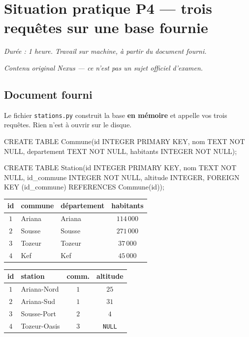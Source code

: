 \section*{Situation pratique P4 --- trois requêtes sur une base fournie}

\textit{Durée : 1 heure. Travail sur machine, à partir du document fourni.}

\medskip
\textit{Contenu original Nexus --- ce n'est pas un sujet officiel d'examen.}

\subsection*{Document fourni}

Le fichier \lstinline{stations.py} construit la base \textbf{en mémoire} et
appelle vos trois requêtes. Rien n'est à ouvrir sur le disque.

\begin{sql}
CREATE TABLE Commune(id INTEGER PRIMARY KEY, nom TEXT NOT NULL,
                     departement TEXT NOT NULL, habitants INTEGER NOT NULL);

CREATE TABLE Station(id INTEGER PRIMARY KEY, nom TEXT NOT NULL,
                     id_commune INTEGER NOT NULL, altitude INTEGER,
                     FOREIGN KEY (id_commune) REFERENCES Commune(id));
\end{sql}

\begin{center}
\begin{tabular}{|c|l|l|c|}
\hline
\textbf{id} & \textbf{commune} & \textbf{département} & \textbf{habitants} \\
\hline
$1$ & Ariana & Ariana & $114\,000$ \\
\hline
$2$ & Sousse & Sousse & $271\,000$ \\
\hline
$3$ & Tozeur & Tozeur & $37\,000$ \\
\hline
$4$ & Kef & Kef & $45\,000$ \\
\hline
\end{tabular}
\qquad
\begin{tabular}{|c|l|c|c|}
\hline
\textbf{id} & \textbf{station} & \textbf{comm.} & \textbf{altitude} \\
\hline
$1$ & Ariana-Nord & $1$ & $25$ \\
\hline
$2$ & Ariana-Sud & $1$ & $31$ \\
\hline
$3$ & Sousse-Port & $2$ & $4$ \\
\hline
$4$ & Tozeur-Oasis & $3$ & \texttt{NULL} \\
\hline
\end{tabular}
\end{center}

